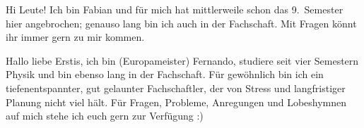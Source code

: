 \begin{multicols*}{2}
{Hi Leute! Ich bin Fabian und für mich hat mittlerweile schon das 9.~Semester hier angebrochen; genauso lang bin ich auch in der Fachschaft. Mit Fragen könnt ihr immer gern zu mir kommen.
\vspace{2\baselineskip}}


{Hallo liebe Erstis, ich bin (Europameister) Fernando, studiere seit vier Semestern Physik und bin ebenso lang in der Fachschaft.
Für gewöhnlich bin ich ein tiefenentspannter, gut gelaunter Fachschaftler, der von Stress und langfristiger Planung nicht viel hält.
Für Fragen, Probleme, Anregungen und Lobeshymnen auf mich stehe ich euch gern zur Verfügung :)}


\end{multicols*}
